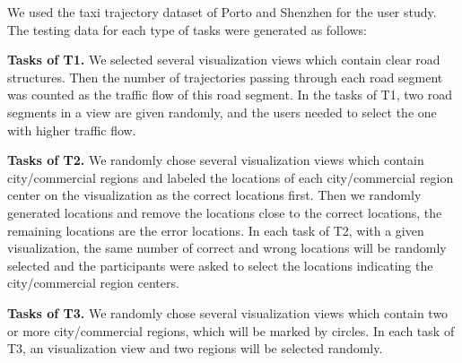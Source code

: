 We used the taxi trajectory dataset of Porto and Shenzhen for the user study. The testing data for each type of tasks were generated as follows:

\textbf{Tasks of T1.} We selected several visualization views which contain clear road structures. Then the number of trajectories passing through each road segment was counted as the traffic flow of this road segment. In the tasks of T1, two road segments in a view are given randomly, and the users needed to select the one with higher traffic flow.  

\textbf{Tasks of T2.} We randomly chose several visualization views which contain city/commercial regions and labeled the locations of each city/commercial region center on the visualization as the correct locations first.  Then we randomly generated locations and remove the locations close to the correct locations, the remaining locations are the error locations. In each task of T2, with a given visualization, the same number of correct and wrong locations will be randomly selected and the participants were asked to select the locations indicating the city/commercial region centers. 

\textbf{Tasks of T3.} We randomly chose several visualization views which contain two or more city/commercial regions, which will be marked by circles. In each task of T3, an visualization view and two regions will be selected randomly.


